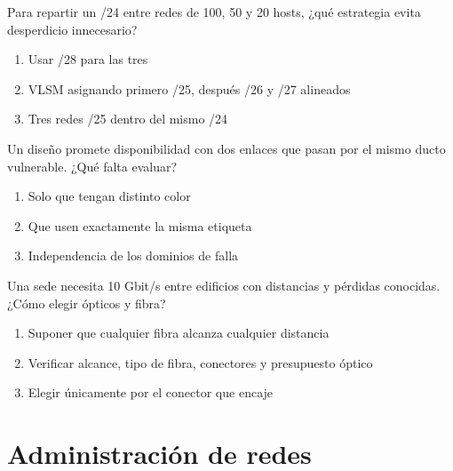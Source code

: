\noindent\begin{minipage}{\linewidth}\setlength{\parskip}{4pt}\label{q:R-025}
Para repartir un /24 entre redes de 100, 50 y 20 hosts, ¿qué estrategia evita desperdicio innecesario?
\begin{enumerate}[label=\Alph*),nosep]
\item Usar /28 para las tres
\item VLSM asignando primero /25, después /26 y /27 alineados
\item Tres redes /25 dentro del mismo /24
\end{enumerate}\end{minipage}\par\medskip

\noindent\begin{minipage}{\linewidth}\setlength{\parskip}{4pt}\label{q:R-026}
Un diseño promete disponibilidad con dos enlaces que pasan por el mismo ducto vulnerable. ¿Qué falta evaluar?
\begin{enumerate}[label=\Alph*),nosep]
\item Solo que tengan distinto color
\item Que usen exactamente la misma etiqueta
\item Independencia de los dominios de falla
\end{enumerate}\end{minipage}\par\medskip

\noindent\begin{minipage}{\linewidth}\setlength{\parskip}{4pt}\label{q:R-027}
Una sede necesita 10 Gbit/s entre edificios con distancias y pérdidas conocidas. ¿Cómo elegir ópticos y fibra?
\begin{enumerate}[label=\Alph*),nosep]
\item Suponer que cualquier fibra alcanza cualquier distancia
\item Verificar alcance, tipo de fibra, conectores y presupuesto óptico
\item Elegir únicamente por el conector que encaje
\end{enumerate}\end{minipage}\par\medskip

\section{Administración de redes}

